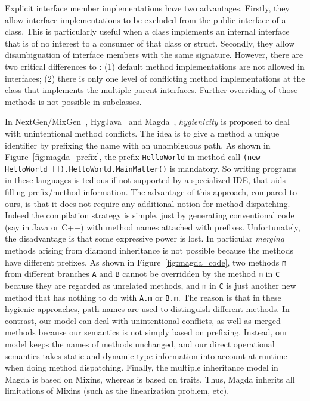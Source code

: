 Explicit interface member implementations have two advantages.
Firstly, they allow interface implementations to be excluded 
from the public interface of a class. This is particularly useful when a class implements an internal 
interface that is of no interest to a consumer of that class or struct.
Secondly, they allow disambiguation of interface members with the 
same signature. However, there are two critical differences to \MIM{}:
(1) default method implementations are not allowed in \csharp{} interfaces; 
(2) there is only one level of conflicting method implementations at the
class that implements the multiple parent interfaces. Further
overriding of those methods is not possible in subclasses.

In NextGen/MixGen~\cite{Allen:2003:FAG:949305.949316},
HygJava~\cite{kusmierek2007hygienic} and
Magda~\cite{Bono:2012:MNL:2367163.2367198}, \emph{hygienicity} is
proposed to deal with unintentional method conflicts. The idea is 
to give a method a unique identifier by prefixing the name
with an unambiguous path. As shown in Figure~\ref{fig:magda_prefix},
the prefix \lstinline|HelloWorld| in method call \lstinline|(new HelloWorld []).HelloWorld.MainMatter()| is mandatory. So writing programs in these languages is
tedious if not supported by a specialized IDE, that aids filling
prefix/method information.  The advantage of this
approach, compared to ours, is that it does not require any additional
notion for method dispatching. Indeed
the compilation strategy is simple, just by generating conventional code (say
in Java or C++) with
method names attached with prefixes. Unfortunately, the disadvantage
is that some expressive power is lost. In particular \emph{merging}
methods arising from diamond inheritance is not possible because the 
methods have different prefixes. 
As shown in Figure~\ref{fig:magda_code}, two methods
\lstinline|m| from different branches \lstinline|A| and \lstinline|B|
cannot be overridden by the method \lstinline|m| in \lstinline|C|
because they are regarded as unrelated methods, and \lstinline|m| in
\lstinline|C| is just another new method that has nothing to do with
\lstinline|A.m| or \lstinline|B.m|. The reason is that in these
hygienic approaches, path names are used to distinguish different
methods. In contrast, our model can deal with unintentional conflicts,
as well as merged methods because our semantics is not simply based on
prefixing. Instead, our model keeps the names of methods unchanged,
and our direct operational semantics takes static and
dynamic type information into account at runtime when doing method
dispatching. Finally, the multiple inheritance model in Magda is based on
Mixins, whereas \MIM{} is based on traits. Thus, Magda inherits all
limitations of Mixins (such as the linearization problem, etc).

